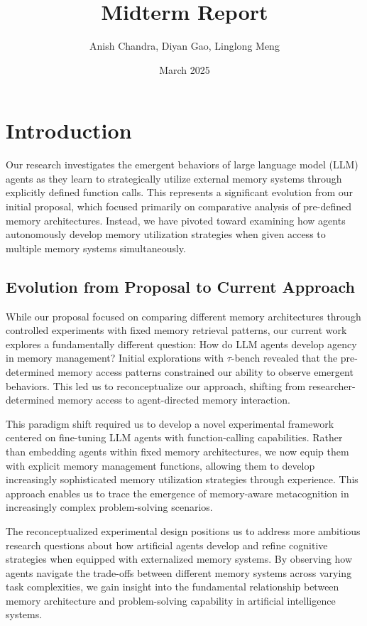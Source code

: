 \documentclass{article}
\title{\Large\textbf{Midterm Report}}
\author{Anish Chandra, Diyan Gao, Linglong Meng}
\date{March 2025}
\begin{document}
\maketitle

\section{Introduction}

Our research investigates the emergent behaviors of large language model (LLM) agents as they learn to strategically utilize external memory systems through explicitly defined function calls. This represents a significant evolution from our initial proposal, which focused primarily on comparative analysis of pre-defined memory architectures. Instead, we have pivoted toward examining how agents autonomously develop memory utilization strategies when given access to multiple memory systems simultaneously.

\subsection{Evolution from Proposal to Current Approach}

While our proposal focused on comparing different memory architectures through controlled experiments with fixed memory retrieval patterns, our current work explores a fundamentally different question: How do LLM agents develop agency in memory management? Initial explorations with $\tau$-bench revealed that the pre-determined memory access patterns constrained our ability to observe emergent behaviors. This led us to reconceptualize our approach, shifting from researcher-determined memory access to agent-directed memory interaction.

This paradigm shift required us to develop a novel experimental framework centered on fine-tuning LLM agents with function-calling capabilities. Rather than embedding agents within fixed memory architectures, we now equip them with explicit memory management functions, allowing them to develop increasingly sophisticated memory utilization strategies through experience. This approach enables us to trace the emergence of memory-aware metacognition in increasingly complex problem-solving scenarios.

The reconceptualized experimental design positions us to address more ambitious research questions about how artificial agents develop and refine cognitive strategies when equipped with externalized memory systems. By observing how agents navigate the trade-offs between different memory systems across varying task complexities, we gain insight into the fundamental relationship between memory architecture and problem-solving capability in artificial intelligence systems.
\end{document}
